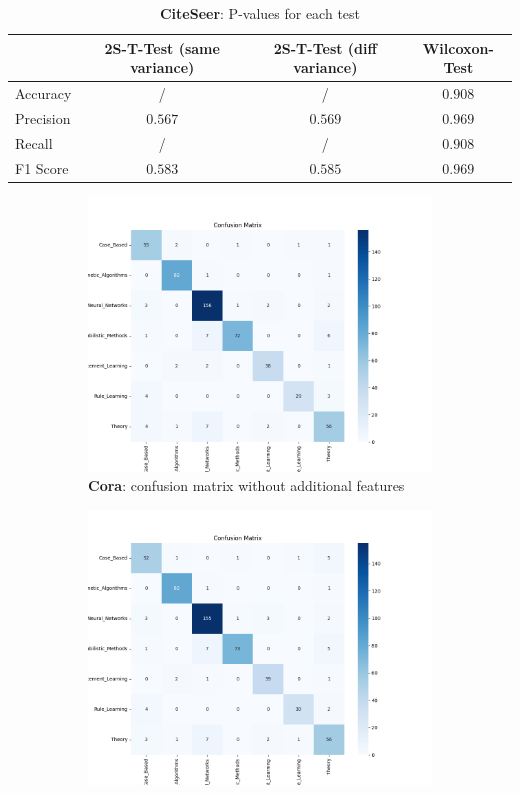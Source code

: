 \documentclass[12pt,conference]{ieeeconf} %
\begin{document}
\begin{table}[h!]
    \centering 
    \begin{tabular}{|l|c|c|c|} 
    \hline
     & 2S-T-Test (same variance) & 2S-T-Test (diff variance) & Wilcoxon-Test\\ \hline
    Accuracy &/ &/ &$0.908$ \\ \hline
    Precision &$0.567$ &$0.569$ &$0.969$\\ \hline
    Recall &/ &/ &$0.908$\\ \hline
    F1 Score &$0.583$ &$0.585$ &$0.969$\\ \hline
    \end{tabular}
    \caption{\textbf{CiteSeer}: P-values for each test}
    \label{table:CiteSeer_Pval}
\end{table}

\begin{figure}[h!]
    \begin{subfigure}[t]{.4\textwidth}
      \centering
      \includegraphics[width=\linewidth]{img/Cora_CM_GAT.png}
      \caption{\textbf{Cora}: confusion matrix without additional features}
    \end{subfigure}
    \hfill
    \begin{subfigure}[t]{.4\textwidth}
      \centering
      \includegraphics[width=\linewidth]{img/Cora_CM_GATTO.png}

\end{subfigure}
\end{figure}
\end{document}
